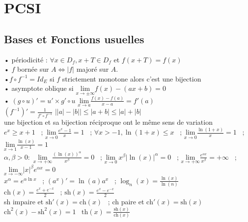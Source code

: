 \documentclass[12 pt]{book}
\begin{document}
\newcommand{\SN}{\sum_{i=1}^n}
\newcommand{\SI}{\sum_{n=0}^{+\infty}}
\newcommand{\PN}{\prod_{i=1}^n}
\newcommand{\TI}{\xrightarrow[+\infty]{}}
\newcommand{\LI}{\lim_{n\to +\infty}}
\newcommand{\dt}{\; \text{d}t}
\newcommand{\dx}{\; \text{d}x}


\chapter*{PCSI}
\section*{Bases et Fonctions usuelles} 

\begin{flushleft}
\begin{doublespace}
	• périodicité : $\forall x \in D_f, x+T \in D_f$ et $ f(x+T)=f(x)$ \\
	• $f$ bornée sur $A \Leftrightarrow |f|$ majoré sur $A$.\\
	•$f\circ f^{-1}=Id_E$ si $f$ strictement monotone alors c'est une bijection \\
	• asymptote oblique si $\underset{x \rightarrow \pm \infty}{\text{lim}} f(x)-(ax+b)=0$ \\
	• $(g\circ u)'=u' \times g'\circ u$ \quad $\underset{x \rightarrow a}{\text{lim}} \frac{f(x)-f(a)}{x-a} = f'(a)$ \\
	$(f^{-1})'=\frac{1}{f'\circ f^{-1}}$ \quad $\Big| |a|-|b| \Big| \leq |a+b| \leq |a|+|b|$ \\
	une bijection et sa bijection réciproque ont le même sens de variation \\
	$e^x \geq x+1$ \ ;  $\underset{x \rightarrow 0}{\text{lim}} \frac{e^x -1}{x} = 1$ \ ;  $\forall x> -1, \ln(1+x) \leq x$ \ ;  $\underset{x \rightarrow 0}{\text{lim}} \frac{\ln(1+x)}{x} = 1$ \ ;  $\underset{x \rightarrow 1}{\text{lim}} \frac{\ln(x)}{x-1} = 1$ \\
	$\alpha , \beta > 0 :$ $\underset{x \rightarrow + \infty}{\text{lim}} \frac{(\ln(x))^\alpha}{x^\beta} = 0$ \ ;  $\underset{x \rightarrow 0}{\text{lim}}\ x^\beta \big| \ln(x) \big|^\alpha = 0 $ \ ; $\underset{x \rightarrow + \infty}{\text{lim}} \frac{e^{\alpha x}}{x^\beta} = + \infty$ \ ; $\underset{x \rightarrow - \infty}{\text{lim}} |x|^\beta e^{\alpha x} = 0$ \\
	$x^\alpha = e^{\alpha \ln x}$ \ ; $(a^x)' = \ln(a) a^x$ \ ; $\log_n(x) = \frac{\ln(x)}{\ln(n)}$ \\
	$\text{ch}(x) = \frac{e^x + e^{-x}}{2}$ \ ; $\text{sh}(x) = \frac{e^x - e^{-x}}{2}$ \\
	sh impaire et $\text{sh}'(x)=\text{ch}(x)$ \ ; ch paire et $\text{ch}'(x)=\text{sh}(x)$ \ $\text{ch}^2(x) - \text{sh}^2(x) = 1$ \ $\text{th}(x) = \frac{\text{sh}(x)}{\text{ch}(x)}$ \\ 
	

\end{doublespace}
\end{flushleft}
\end{document}
